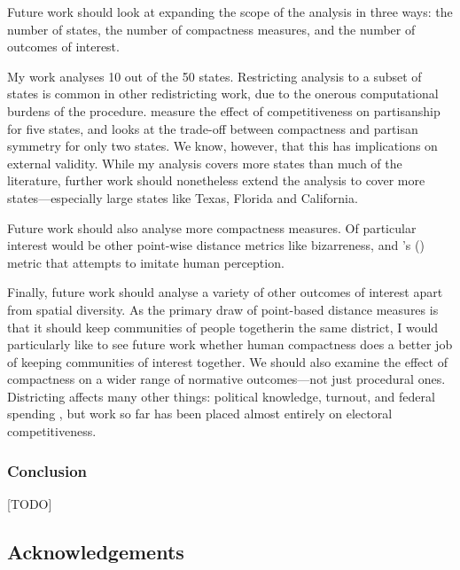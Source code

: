 \documentclass[]{article}
\begin{document}
Future work should look at expanding the scope of the analysis in three
ways: the number of states, the number of compactness measures, and the
number of outcomes of interest.

My work analyses 10 out of the 50 states. Restricting analysis to a
subset of states is common in other redistricting work, due to the
onerous computational burdens of the procedure. \cite{ddj2019comp}
measure the effect of competitiveness on partisanship for five states,
and \cite{s2020} looks at the trade-off between compactness and partisan
symmetry for only two states. We know, however, that this has
implications on external validity. While my analysis covers more states
than much of the literature, further work should nonetheless extend the
analysis to cover more states---especially large states like Texas,
Florida and California.

Future work should also analyse more compactness measures. Of particular
interest would be other point-wise distance metrics like bizarreness,
and \citeauthor{kingwp}'s (\citeyear{kingwp}) metric that attempts to
imitate human perception.

Finally, future work should analyse a variety of other outcomes of
interest apart from spatial diversity. As the primary draw of
point-based distance measures is that it should keep communities of
people togetherin the same district, I would particularly like to see
future work whether human compactness does a better job of keeping
communities of interest together. We should also examine the effect of
compactness on a wider range of normative outcomes---not just procedural
ones. Districting affects many other things: political knowledge,
turnout, and federal spending \citep{snyder2010}, but work so far has
been placed almost entirely on electoral competitiveness.

\hypertarget{conclusion}{%
\subsubsection{Conclusion}\label{conclusion}}

{[}TODO{]}

\hypertarget{acknowledgements}{%
\subsection{Acknowledgements}\label{acknowledgements}}
\end{document}
